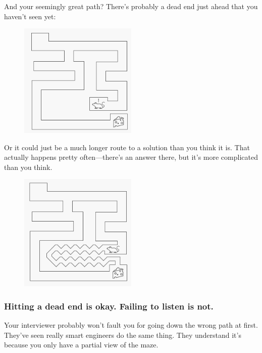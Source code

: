 \documentclass{article}
\begin{document}
And your seemingly great path? There's probably a dead end just ahead that you haven't seen yet: 


\begin{figure}[H]
  \centering
  \includegraphics[width=0.5\textwidth]{pics/maze5}
  \label{fig:maze5}
\end{figure}


Or it could just be a much longer route to a solution than you think it is. That actually happens pretty often—there's an answer there, but it's more complicated than you think. 


\begin{figure}[H]
  \centering
  \includegraphics[width=0.5\textwidth]{pics/maze6}
  \label{fig:maze6}
\end{figure}


\subsubsection{Hitting a dead end is okay. Failing to listen is not.}

Your interviewer probably won't fault you for going down the wrong path at first. They've seen really smart engineers do the same thing. They understand it's because you only have a partial view of the maze.
\end{document}
